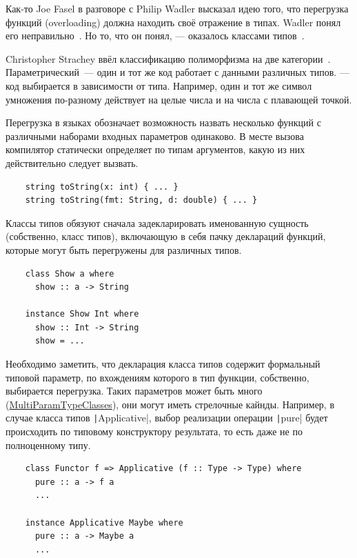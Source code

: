 
Как-то Joe Fasel в разговоре с Philip Wadler высказал идею того, что перегрузка функций (overloading) должна находить своё отражение в типах.
Wadler понял его неправильно~\cite{hudak2007history}.
Но то, что он понял, --- оказалось классами типов~\cite{wadler1989make}.

Christopher Strachey ввёл классификацию полиморфизма на две категории~\cite{strachey2000fundamental}.
Параметрический~--- один и тот же код работает с данными различных типов.
 --- код выбирается в зависимости от типа.
Например, один и тот же символ умножения по-разному действует на целые числа и на числа с плавающей точкой.

Перегрузка в языках обозначает возможность назвать несколько функций с различными наборами входных параметров одинаково.
В месте вызова компилятор статически определяет по типам аргументов, какую из них действительно следует вызвать.
\begin{verbatim}
    string toString(x: int) { ... }
    string toString(fmt: String, d: double) { ... }
\end{verbatim}

Классы типов обязуют сначала задекларировать именованную сущность (собственно, класс типов), включающую в себя пачку деклараций функций, которые могут быть перегружены для различных типов.
\begin{verbatim}
    class Show a where
      show :: a -> String

    instance Show Int where
      show :: Int -> String
      show = ...
\end{verbatim}

Необходимо заметить, что декларация класса типов содержит формальный типовой параметр, по вхождениям которого в тип функции, собственно, выбирается перегрузка.
Таких параметров может быть много (\href{https://ghc.gitlab.haskell.org/ghc/doc/users_guide/exts/multi_param_type_classes.html}{MultiParamTypeClasses}), они могут иметь стрелочные кайнды.
Например, в случае класса типов \texttt|Applicative|, выбор реализации операции \texttt|pure| будет происходить по типовому конструктору результата, то есть даже не по полноценному типу.
\begin{verbatim}
    class Functor f => Applicative (f :: Type -> Type) where
      pure :: a -> f a
      ...

    instance Applicative Maybe where
      pure :: a -> Maybe a
      ...
\end{verbatim}

